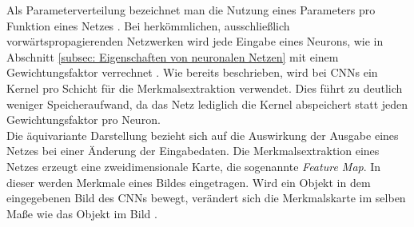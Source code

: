 		Als Parameterverteilung bezeichnet man die Nutzung eines Parameters pro Funktion eines Netzes \cite{deeplearning}. Bei herkömmlichen, ausschließlich vorwärtspropagierenden Netzwerken wird jede Eingabe eines Neurons, wie in Abschnitt \ref{subsec: Eigenschaften von neuronalen Netzen} mit einem Gewichtungsfaktor verrechnet  \cite{deeplearning}. Wie bereits beschrieben, wird bei CNNs ein Kernel pro Schicht für die Merkmalsextraktion verwendet. Dies führt zu deutlich weniger Speicheraufwand, da das Netz lediglich die Kernel abspeichert statt jeden Gewichtungsfaktor pro Neuron.\\
		
		Die äquivariante Darstellung bezieht sich auf die Auswirkung der Ausgabe eines Netzes bei einer Änderung der Eingabedaten. Die Merkmalsextraktion eines Netzes erzeugt eine zweidimensionale Karte, die sogenannte \textit{Feature Map}. In dieser werden Merkmale eines Bildes eingetragen. Wird ein Objekt in dem eingegebenen Bild des CNNs bewegt, verändert sich die Merkmalskarte im selben Maße wie das Objekt im Bild \cite{deeplearning}.\\		
		
	
		
